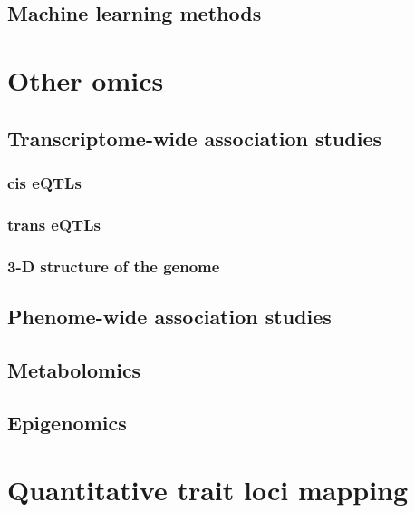 \documentclass[]{book}
\theoremstyle{definition}
\theoremstyle{definition}
\theoremstyle{definition}
\theoremstyle{remark}
\begin{document}
\section{Machine learning methods}\label{machine-learning-methods-1}

\chapter{Other omics}\label{other-omics}

\section{Transcriptome-wide association
studies}\label{transcriptome-wide-association-studies}

\subsection{cis eQTLs}\label{cis-eqtls}

\subsection{trans eQTLs}\label{trans-eqtls}

\subsection{3-D structure of the
genome}\label{d-structure-of-the-genome}

\section{Phenome-wide association
studies}\label{phenome-wide-association-studies}

\section{Metabolomics}\label{metabolomics}

\section{Epigenomics}\label{epigenomics}

\chapter{Quantitative trait loci
mapping}\label{quantitative-trait-loci-mapping}
\end{document}
